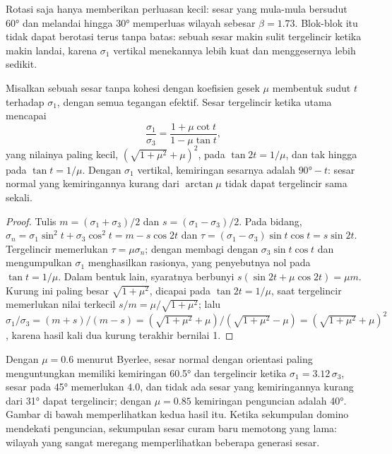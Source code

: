 Rotasi saja hanya memberikan perluasan kecil: sesar yang mula-mula bersudut \ang{60} dan
melandai hingga \ang{30} memperluas wilayah sebesar $\beta = 1.73$. Blok-blok itu tidak dapat berotasi
terus tanpa batas: sebuah sesar makin sulit tergelincir ketika makin landai, karena $\sigma_1$ vertikal
menekannya lebih kuat dan menggesernya lebih sedikit.

\begin{proposition}\label{prop:b3:extension-strike-slip:lockup}
Misalkan sebuah sesar tanpa kohesi dengan koefisien gesek $\mu$ membentuk sudut
$t$ terhadap $\sigma_1$, dengan semua tegangan efektif. Sesar tergelincir ketika  utama mencapai
\[
  \frac{\sigma_1}{\sigma_3} = \frac{1 + \mu\cot t}{1 - \mu\tan t} ,
\]
yang nilainya paling kecil, $(\sqrt{1 + \mu^2} + \mu)^2$, pada $\tan2t = 1/\mu$, dan
tak hingga pada $\tan t = 1/\mu$. Dengan $\sigma_1$ vertikal, kemiringan sesarnya adalah
$\ang{90} - t$: sesar normal yang kemiringannya kurang dari $\arctan\mu$ tidak dapat tergelincir
sama sekali.
\end{proposition}

\begin{proof}
Tulis $m = (\sigma_1 + \sigma_3)/2$ dan $s = (\sigma_1 - \sigma_3)/2$. Pada
bidang, $\sigma_n = \sigma_1\sin^2t + \sigma_3\cos^2t = m - s\cos2t$ dan
$\tau = (\sigma_1 - \sigma_3)\sin t\cos t = s\sin2t$. Tergelincir memerlukan $\tau =
\mu\sigma_n$; dengan membagi dengan $\sigma_3\sin t\cos t$ dan mengumpulkan $\sigma_1$
menghasilkan rasionya, yang penyebutnya nol pada $\tan t = 1/\mu$. Dalam bentuk lain,
syaratnya berbunyi $s(\sin2t + \mu\cos2t) = \mu m$. Kurung ini paling
besar $\sqrt{1 + \mu^2}$, dicapai pada $\tan2t = 1/\mu$, saat tergelincir memerlukan
nilai terkecil $s/m = \mu/\sqrt{1 + \mu^2}$; lalu $\sigma_1/\sigma_3 = (m + s)/(m - s) =
(\sqrt{1 + \mu^2} + \mu)/(\sqrt{1 + \mu^2} - \mu) = (\sqrt{1 + \mu^2} +
\mu)^2$, karena hasil kali dua kurung terakhir bernilai 1.
\end{proof}

Dengan $\mu = 0.6$ menurut Byerlee, sesar normal dengan orientasi paling menguntungkan memiliki kemiringan \ang{60.5} dan
tergelincir ketika $\sigma_1 = 3.12\,\sigma_3$, sesar pada \ang{45} memerlukan $4.0$, dan
tidak ada sesar yang kemiringannya kurang dari \ang{31} dapat tergelincir; dengan $\mu = 0.85$ kemiringan penguncian adalah
\ang{40}. Gambar di bawah memperlihatkan kedua hasil itu. Ketika sekumpulan domino mendekati
penguncian, sekumpulan sesar curam baru memotong yang lama: wilayah yang sangat meregang
memperlihatkan beberapa generasi sesar.

